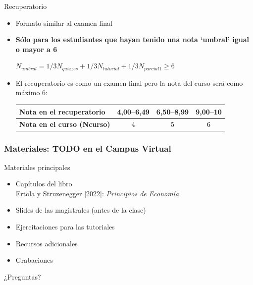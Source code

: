 \documentclass{beamer}
\begin{document}
\begin{frame}{Recuperatorio}
    \begin{itemize}
        \item Formato similar al examen final \vspace{2mm}
        \item \textbf{Sólo para los estudiantes que hayan tenido una nota ‘umbral’ igual o mayor a 6}
        \begin{center}
            $N_{umbral}=1/3N_{quizzes}+1/3N_{tutorial}+1/3N_{parcial 1} \geq 6$
        \end{center}
        \item El recuperatorio es como un examen final pero la nota del curso será como máximo 6:
        
        \begin{tabular}{|l|c|c|c|}
            \hline
            \textbf{Nota en el recuperatorio} & \textbf{4,00--6,49} & \textbf{6,50--8,99} & \textbf{9,00--10} \\
            \hline
            \textbf{Nota en el curso (Ncurso)} & 4 & 5 & 6 \\
            \hline
        \end{tabular}    
    \end{itemize}
\end{frame}

\begin{frame}
\frametitle{Materiales: TODO en el Campus Virtual}
Materiales principales
\begin{itemize}
    \item Capítulos del libro \vspace{2mm}  \\
    Ertola y Struzenegger [2022]:  \textit{Principios de Economía} \vspace{2mm} 
    \item Slides de las magistrales (antes de la clase) \vspace{2mm}
    \item Ejercitaciones para las tutoriales \vspace{2mm}
    \item Recursos adicionales \vspace{2mm}
    \item Grabaciones \vspace{2mm}
\end{itemize}
\end{frame}


\begin{frame}
\begin{center}
    \Huge ¿Preguntas?
\end{center}
\end{frame}
\end{document}
